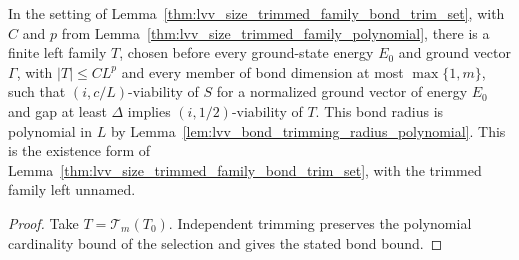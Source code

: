 \begin{lemma}
    \label{thm:lvv_size_bond_trimmed_family}
    \leanok
    In the setting of Lemma~\ref{thm:lvv_size_trimmed_family_bond_trim_set},
    with $C$ and $p$ from Lemma~\ref{thm:lvv_size_trimmed_family_polynomial},
    there is a finite left family $T$, chosen before every ground-state
    energy $E_0$ and ground vector $\Gamma$, with $|T|\le CL^p$ and every
    member of bond dimension at most $\max\{1,m\}$, such that
    $(i,c/L)$-viability of $S$ for a normalized ground vector of energy
    $E_0$ and gap at least $\Delta$ implies $(i,1/2)$-viability of $T$.
    This bond radius is polynomial in $L$ by
    Lemma~\ref{lem:lvv_bond_trimming_radius_polynomial}. This is the
    existence form of Lemma~\ref{thm:lvv_size_trimmed_family_bond_trim_set},
    with the trimmed family left unnamed.
\end{lemma}
\begin{proof}
    \leanok
    Take $T=\mathcal T_m(T_0)$. Independent trimming preserves the
    polynomial cardinality bound of the selection and gives the stated bond
    bound.
\end{proof}

